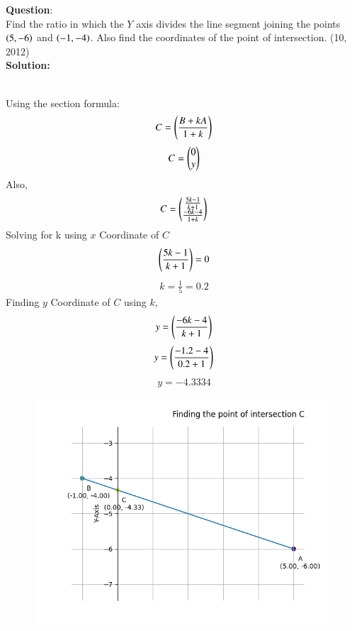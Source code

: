 \documentclass[journal]{IEEEtran}
\begin{document}
\textbf{Question}:\\
Find the ratio in which the $Y$ axis divides the line segment joining the points $\left(5, -6\right)$
and $\left(-1, -4\right)$. Also find the coordinates of the point of intersection. \hfill (10, 2012)
\\ \textbf{Solution: }\\
    \begin{table}[h!]    
      \centering
      
      \caption{}
    \end{table}\\
Using the section formula:
    \begin{align}
        C  = \left(\frac{B + kA}{1 + k}\right) \label{eq1.1.5.33.1}
    \end{align}
    \begin{align}
        C = \begin{pmatrix}0 \\ y\end{pmatrix} \label{eq1.1.5.33.2}
    \end{align}
Also,
    \begin{align}
        C = \begin{pmatrix}\frac{5k-1}{k+1} \\ \frac{-6k-4}{1+k}\end{pmatrix} \label{eq1.1.5.33.3}
    \end{align}
Solving for k using $x$ Coordinate of $C$
    \begin{align}
        \left(\frac{5k-1}{k+1}\right) = 0  \label{eq1.1.5.33.4}
    \end{align}
    \begin{align}
        k = \frac{1}{5} = 0.2\label{eq1.1.5.33.5}
    \end{align}
Finding $y$ Coordinate of $C$ using $k$,
    \begin{align}
        y = \left(\frac{-6k-4}{k+1}\right)  \label{eq1.1.5.33.6}
    \end{align}
    \begin{align}
        y = \left(\frac{-1.2-4}{0.2+1}\right) \label{eq1.1.5.33.7}
    \end{align}
    \begin{align}
        y = -4.3334 \label{eq1.1.5.33.8}
    \end{align}
    \begin{figure}[h]
        \centering
       \includegraphics[width=0.7\linewidth]{figs/fig1.png}
       \caption{}
       \label{graph}
    \end{figure}
\end{document}
